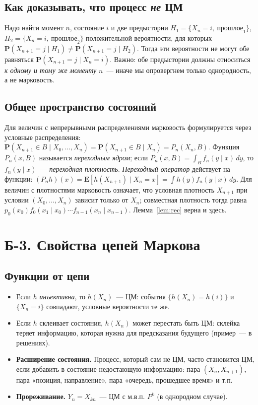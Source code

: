 \documentclass[11pt,a4paper]{article}
\theoremstyle{definition}
\newcommand{\PP}{\mathbf P}
\newcommand{\EE}{\mathbf E}
\newcommand{\1}{\mathbf 1}
\begin{document}
\subsection{Как доказывать, что процесс \emph{не} ЦМ}

Надо найти момент $n$, состояние $i$ и две предыстории
$H_1=\{X_n=i,\ \text{прошлое}_1\}$, $H_2=\{X_n=i,\ \text{прошлое}_2\}$
положительной вероятности, для которых
$\PP(X_{n+1}=j\mid H_1)\ne\PP(X_{n+1}=j\mid H_2)$. Тогда эти вероятности не
могут обе равняться $\PP(X_{n+1}=j\mid X_n=i)$. Важно: обе предыстории должны
относиться \emph{к одному и тому же моменту} $n$~--- иначе мы опровергнем
только однородность, а не марковость.

\subsection{Общее пространство состояний}

Для величин с непрерывными распределениями марковость формулируется через
условные распределения:
$\PP(X_{n+1}\in B\mid X_0,\dots,X_n)=\PP(X_{n+1}\in B\mid X_n)=P_n(X_n,B)$.
Функция $P_n(x,B)$ называется \emph{переходным ядром}; если
$P_n(x,B)=\int_Bf_n(y\mid x)\,dy$, то $f_n(y\mid x)$~--- \emph{переходная
плотность}. \emph{Переходный оператор} действует на функции:
$(P_nh)(x)=\EE[h(X_{n+1})\mid X_n=x]=\int h(y)f_n(y\mid x)\,dy$.
Для величин с плотностями марковость означает, что условная плотность
$X_{n+1}$ при условии $(X_0,\dots,X_n)$ зависит только от $X_n$; совместная
плотность тогда равна $p_0(x_0)f_0(x_1\mid x_0)\cdots f_{n-1}(x_n\mid x_{n-1})$.
Лемма~\ref{lem:rec} верна и здесь.

\section{Б-3. Свойства цепей Маркова}

\subsection{Функции от цепи}

\begin{itemize}
\item Если $h$ \emph{инъективна}, то $h(X_n)$~--- ЦМ: события
$\{h(X_n)=h(i)\}$ и $\{X_n=i\}$ совпадают, условные вероятности те же.
\item Если $h$ склеивает состояния, $h(X_n)$ может перестать быть ЦМ: склейка
теряет информацию, которая нужна для предсказания будущего (пример~--- в
решениях).
\item \textbf{Расширение состояния.} Процесс, который сам не ЦМ, часто
становится ЦМ, если добавить в состояние недостающую информацию: пара
$(X_n,X_{n+1})$, пара «позиция, направление», пара «очередь, прошедшее
время» и т.п.
\item \textbf{Прореживание.} $Y_n=X_{kn}$~--- ЦМ с м.в.п. $P^k$ (в однородном
случае).
\end{itemize}
\end{document}
